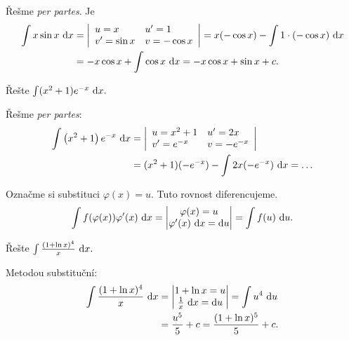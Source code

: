 \begin{reseni}
Řešme \textit{per partes}. Je
\begin{align*}
\int x \sin x \, \mathop{}\!\mathrm{d} x &=\left |\begin{array}{l l}
    u=x & u^\prime= 1\\
    v^\prime = \sin x & v=-\cos x
\end{array} \right | = x(-\cos x)-\int 1\cdot(-\cos x)\, \mathop{}\!\mathrm{d} x \\
&= -x\cos x+\int \cos x \, \mathop{}\!\mathrm{d} x=-x \cos x +\sin x+c.
\end{align*}
\end{reseni}

\begin{priklad}
Řešte $\int (x^2+1)e^{-x}\, \mathop{}\!\mathrm{d} x.$
\end{priklad}

\begin{reseni}
Řešme \textit{per partes}:
\begin{align*}
    \int \left ( x^2+1 \right )e^{-x}\, \mathop{}\!\mathrm{d} x &= \left |\begin{array}{l l}
        u=x^2+1 & u^\prime= 2x\\
        v^\prime = e^{-x} & v=-e^{-x}
    \end{array} \right | \\
    &= (x^2+1)(-e^{-x})-\int 2x(-e^{-x})\, \mathop{}\!\mathrm{d} x = \dots
\end{align*}
\end{reseni}

\begin{pozn}
    Označme si substituci $\varphi(x)=u.$ Tuto rovnost diferencujeme.
    $$\int f(\varphi(x))\varphi^\prime(x)\, \mathop{}\!\mathrm{d} x=\begin{vmatrix}
        \varphi(x)=u \\
        \varphi^\prime(x) \, \mathop{}\!\mathrm{d} x=\mathop{}\!\mathrm{d} u
    \end{vmatrix}=\int f(u)\, \mathop{}\!\mathrm{d} u.$$
\end{pozn}

\begin{priklad}
Řešte $\int \frac{(1+\operatorname{ln} x)^4}{x}\, \mathop{}\!\mathrm{d} x.$
\end{priklad}

\begin{reseni}
Metodou substituční:
\begin{align*}
    \int \frac{(1+\operatorname{ln} x)^4}{x}\, \mathop{}\!\mathrm{d} x &= \begin{vmatrix}
        1+\operatorname{ln} x=u \\
        \frac{1}{x}\, \mathop{}\!\mathrm{d} x=\mathop{}\!\mathrm{d} u
    \end{vmatrix}=\int u^4\, \mathop{}\!\mathrm{d} u \\
    &=\frac{u^5}{5}+c=\frac{(1+\operatorname{ln} x)^5}{5}+c.
\end{align*}
\end{reseni}

